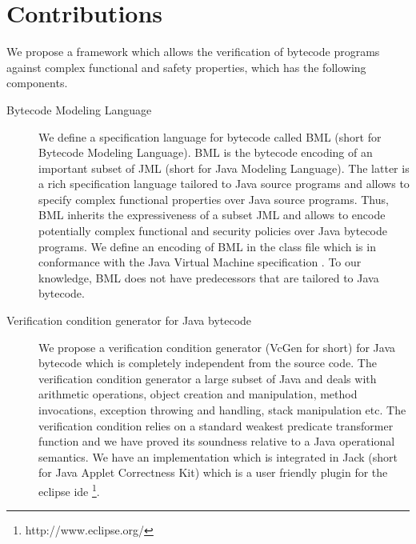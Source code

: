    \section{Contributions}
   We propose a framework which allows the verification of bytecode programs against complex
   functional and safety properties, which has the following    components.
\begin{description}
     \item [Bytecode Modeling Language] 
         


         We define a   specification language for bytecode called BML (short for Bytecode Modeling Language). 
	 BML is the bytecode encoding of an important subset of JML (short for Java Modeling Language). The latter is a rich specification
	 language tailored to Java source programs and allows to specify complex functional properties over Java source programs.
	 Thus, BML inherits the expressiveness of a subset JML and allows to encode potentially 
	 complex functional and security policies over Java bytecode programs.
	 We define an encoding of BML in the class file which is in conformance with the Java Virtual Machine specification \cite{VMSpec}.
	 To our knowledge, BML does not have predecessors that are tailored to Java bytecode.
 
   \item [Verification condition generator for Java bytecode]
	  We propose a verification condition generator (VcGen for short) for Java bytecode which is completely independent from 
	 the source code. The verification condition generator a large subset of Java and deals with
	 arithmetic operations, object creation and manipulation,
	 method invocations, exception throwing and handling, stack manipulation etc.
	 The verification condition relies on a standard weakest predicate transformer function and we
	 have proved its soundness relative to a Java operational semantics.
	 We have an implementation which is integrated in Jack (short for Java Applet Correctness Kit) \cite{BRL-JACK} which is a user friendly 
	 plugin for the eclipse ide \footnote{http://www.eclipse.org/}. 
	 

\end{description}
